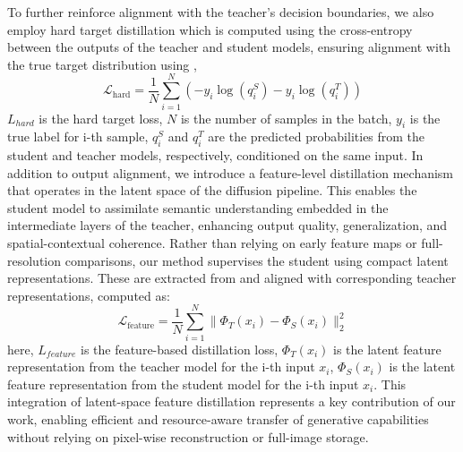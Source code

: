 \documentclass[a4paper,fleqn]{ieeetj}
\begin{document}
To further reinforce alignment with the teacher's decision boundaries, we also employ hard target distillation which is computed using the cross-entropy between the outputs of the teacher and student models, ensuring alignment with the true target distribution using \cite{guo2024shared}, 
\begin{equation}
    \mathcal{L}_{\text{hard}} = \frac{1}{N} \sum_{i=1}^{N} \left( -y_i \log(q_{i}^S) - y_i \log(q_{i}^T) \right)
\end{equation}
$L_{hard}$ is the hard target loss, $N$ is the number of samples in the batch, $y_i$ is the true label for i-th sample, $q_{i}^S$ and $q_{i}^T$ are the predicted probabilities from the student and teacher models, respectively, conditioned on the same input.
In addition to output alignment, we introduce a feature-level distillation mechanism that operates in the latent space of the diffusion pipeline. This enables the student model to assimilate semantic understanding embedded in the intermediate layers of the teacher, enhancing output quality, generalization, and spatial-contextual coherence. Rather than relying on early feature maps or full-resolution comparisons, our method supervises the student using compact latent representations. These are extracted from and aligned with corresponding teacher representations, computed as:
\begin{equation}
    \mathcal{L}_{\text{feature}} = \frac{1}{N} \sum_{i=1}^{N} \| \Phi_T(x_i) - \Phi_S(x_i) \|_2^2
\end{equation}
here, $L_{feature}$ is the feature-based distillation loss, $\Phi_T(x_i)$ is the latent feature representation from the teacher model for the i-th input $x_i$, $\Phi_S(x_i)$ is the latent feature representation from the student model for the i-th input $x_i$. This integration of latent-space feature distillation represents a key contribution of our work, enabling efficient and resource-aware transfer of generative capabilities without relying on pixel-wise reconstruction or full-image storage.
\end{document}
